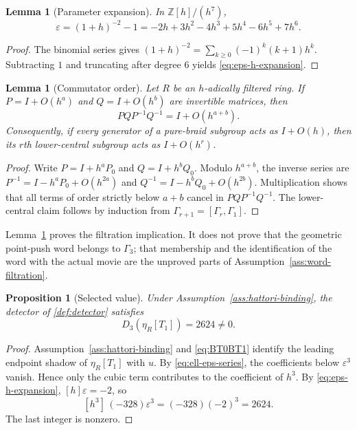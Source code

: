 \documentclass[10pt,reqno]{amsart}
\newtheorem{proposition}[theorem]{Proposition}
\newtheorem{lemma}[theorem]{Lemma}
\theoremstyle{definition}
\theoremstyle{remark}
\newcommand{\Z}{\mathbb Z}
\newcommand{\eps}{\varepsilon}
\begin{document}
\begin{lemma}[Parameter expansion]\label{lem:eps-of-h}
In $\Z[h]/(h^7)$,
\begin{equation}\label{eq:eps-h-expansion}
\eps=(1+h)^{-2}-1=-2h+3h^2-4h^3+5h^4-6h^5+7h^6.
\end{equation}
\end{lemma}

\begin{proof}
The binomial series gives
$(1+h)^{-2}=\sum_{k\ge0}(-1)^k(k+1)h^k$.
Subtracting $1$ and truncating after degree $6$ yields
\cref{eq:eps-h-expansion}.
\end{proof}

\begin{lemma}[Commutator order]\label{lem:commutator-order}
Let $R$ be an $h$-adically filtered ring.  If
$P=I+O(h^a)$ and $Q=I+O(h^b)$ are invertible matrices, then
\begin{equation}\label{eq:commutator-order}
PQP^{-1}Q^{-1}=I+O(h^{a+b}).
\end{equation}
Consequently, if every generator of a pure-braid subgroup acts as
$I+O(h)$, then its $r$th lower-central subgroup acts as $I+O(h^r)$.
\end{lemma}

\begin{proof}
Write $P=I+h^aP_0$ and $Q=I+h^bQ_0$.  Modulo $h^{a+b}$, the inverse series
are $P^{-1}=I-h^aP_0+O(h^{2a})$ and
$Q^{-1}=I-h^bQ_0+O(h^{2b})$.  Multiplication shows that all terms of order
strictly below $a+b$ cancel in $PQP^{-1}Q^{-1}$.  The lower-central claim
follows by induction from
$\Gamma_{r+1}=[\Gamma_r,\Gamma_1]$.
\end{proof}

Lemma~\ref{lem:commutator-order} proves the filtration implication.  It does
not prove that the geometric point-push word belongs to $\Gamma_3$; that
membership and the identification of the word with the actual movie are the
unproved parts of Assumption~\ref{ass:word-filtration}.

\begin{proposition}[Selected value]\label{prop:D3-vT}
Under Assumption~\ref{ass:hattori-binding}, the detector of
\cref{def:detector} satisfies
\begin{equation}\label{eq:D3-vT}
D_3(\eta_R[T_1])=2624\ne0.
\end{equation}
\end{proposition}

\begin{proof}
Assumption~\ref{ass:hattori-binding} and \cref{eq:BT0BT1} identify the
leading endpoint shadow of $\eta_R[T_1]$ with $u$.  By
\cref{eq:ell-eps-series}, the coefficients below $\eps^3$ vanish.  Hence only
the cubic term contributes to the coefficient of $h^3$.  By
\cref{eq:eps-h-expansion}, $[h]\eps=-2$, so
\begin{equation}\label{eq:D3-vT-calc}
[h^3]\,(-328)\eps^3=(-328)(-2)^3=2624.
\end{equation}
The last integer is nonzero.
\end{proof}
\end{document}
